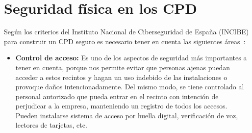 \section{Seguridad física en los CPD}\label{sec:seguridad_fisica_CPD}
Según los criterios del Instituto Nacional de Ciberseguridad de España (INCIBE) para construir un CPD seguro es necesario tener en cuenta las siguientes áreas~\cite{noauthor_pon_2015}:
\begin{itemize}
	\item \textbf{Control de acceso:} Es uno de los aspectos de seguridad más importantes a tener en cuenta, porque nos permite evitar que personas ajenas puedan acceder a estos recintos y hagan un uso indebido de las instalaciones o provoque daños intencionadamente. Del mismo modo, se tiene controlado al personal autorizado que pueda entrar en el recinto con intención de perjudicar a la empresa, manteniendo un registro de todos los accesos. Pueden instalarse sistema de acceso por huella digital, verificación de voz, lectores de tarjetas, etc.


\end{itemize}

